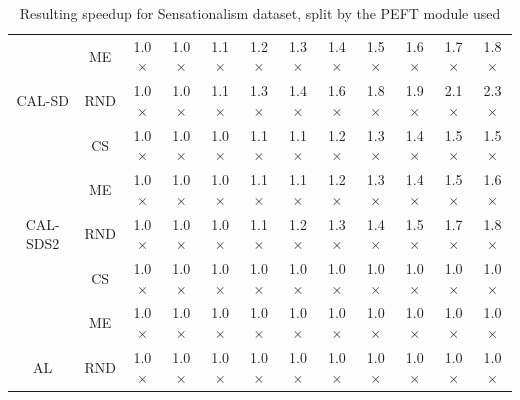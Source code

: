 \begin{table}[htbp]
\begin{subtable}{\linewidth}
\begin{tabular}{c|c|cccccccccc}
 & ME & 1.0$\times$ & 1.0$\times$ & 1.1$\times$ & 1.2$\times$ & 1.3$\times$ & 1.4$\times$ & 1.5$\times$ & 1.6$\times$ & 1.7$\times$ & 1.8$\times$\\

\multirow{-3}{*}{\raggedright\arraybackslash CAL-SD} & RND & 1.0$\times$ & 1.0$\times$ & 1.1$\times$ & 1.3$\times$ & 1.4$\times$ & 1.6$\times$ & 1.8$\times$ & 1.9$\times$ & 2.1$\times$ & 2.3$\times$\\
\midrule
 & CS & 1.0$\times$ & 1.0$\times$ & 1.0$\times$ & 1.1$\times$ & 1.1$\times$ & 1.2$\times$ & 1.3$\times$ & 1.4$\times$ & 1.5$\times$ & 1.5$\times$\\

 & ME & 1.0$\times$ & 1.0$\times$ & 1.0$\times$ & 1.1$\times$ & 1.1$\times$ & 1.2$\times$ & 1.3$\times$ & 1.4$\times$ & 1.5$\times$ & 1.6$\times$\\

\multirow{-3}{*}{\raggedright\arraybackslash CAL-SDS2} & RND & 1.0$\times$ & 1.0$\times$ & 1.0$\times$ & 1.1$\times$ & 1.2$\times$ & 1.3$\times$ & 1.4$\times$ & 1.5$\times$ & 1.7$\times$ & 1.8$\times$\\
\midrule
 & CS & 1.0$\times$ & 1.0$\times$ & 1.0$\times$ & 1.0$\times$ & 1.0$\times$ & 1.0$\times$ & 1.0$\times$ & 1.0$\times$ & 1.0$\times$ & 1.0$\times$\\

 & ME & 1.0$\times$ & 1.0$\times$ & 1.0$\times$ & 1.0$\times$ & 1.0$\times$ & 1.0$\times$ & 1.0$\times$ & 1.0$\times$ & 1.0$\times$ & 1.0$\times$\\

\multirow{-3}{*}{\raggedright\arraybackslash AL} & RND & 1.0$\times$ & 1.0$\times$ & 1.0$\times$ & 1.0$\times$ & 1.0$\times$ & 1.0$\times$ & 1.0$\times$ & 1.0$\times$ & 1.0$\times$ & 1.0$\times$\\
\bottomrule
\end{tabular}
\end{subtable}
\caption{Resulting speedup for Sensationalism dataset, split by the PEFT module used}
\label{tab:speedup_short_sensation_10}
\end{table}
